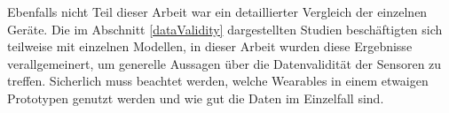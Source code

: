Ebenfalls nicht Teil dieser Arbeit war ein detaillierter Vergleich der einzelnen Geräte. Die im Abschnitt \ref{dataValidity} dargestellten Studien beschäftigten sich teilweise mit einzelnen Modellen, in dieser Arbeit wurden diese Ergebnisse verallgemeinert, um generelle Aussagen über die Datenvalidität der Sensoren zu treffen. Sicherlich muss beachtet werden, welche Wearables in einem etwaigen Prototypen genutzt werden und wie gut die Daten im Einzelfall sind.
